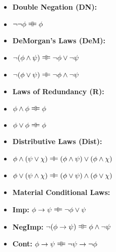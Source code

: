 \begin{multicols}{2}

\begin{itemize}
\item[] \textbf{Double Negation (DN):}
\item[]$\enot\enot \meta{\phi} \lequiv \meta{\phi}$


\item[] \textbf{DeMorgan's Laws (DeM):}

\item[] $\enot(\meta{\phi} \eand  \meta{\psi}) \lequiv \enot \meta{\phi} \eor \enot \meta{\psi}$
\item[] $\enot(\meta{\phi} \eor \meta{\psi}) \lequiv \enot \meta{\phi} \eand  \enot \meta{\psi}$


\item[]  \textbf{Laws of Redundancy (R):}

\item[] $\meta{\phi} \eand  \meta{\phi} \lequiv \meta{\phi}$
\item[] $\meta{\phi} \eor \meta{\phi} \lequiv \meta{\phi}$


\end{itemize}

\columnbreak

\begin{itemize}
\item[] \textbf{Distributive Laws (Dist):}
\item[] $\meta{\phi} \eand  (\meta{\psi} \eor \meta{\chi}) \lequiv (\meta{\phi} \eand  \meta{\psi}) \eor (\meta{\phi} \eand  \meta{\chi})$
\item[] $\meta{\phi} \eor (\meta{\psi} \eand  \meta{\chi}) \lequiv (\meta{\phi} \eor \meta{\psi}) \eand  (\meta{\phi} \eor \meta{\chi})$

\item[]  \textbf{Material Conditional Laws:}

\item[] \textbf{Imp:} $\meta{\phi} \eif \meta{\psi} \lequiv \enot \meta{\phi} \eor \meta{\psi}$
\item[] \textbf{NegImp:} $\enot(\meta{\phi} \eif \meta{\psi}) \lequiv \meta{\phi} \eand  \enot \meta{\psi}$
\item[] \textbf{Cont:} $\meta{\phi} \eif \meta{\psi} \lequiv \enot \meta{\psi} \eif \enot \meta{\phi}$

\end{itemize}


\end{multicols}

